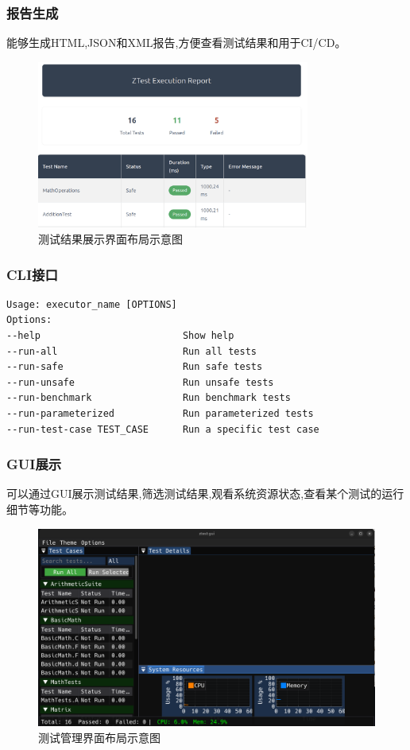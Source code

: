\documentclass{article}
\begin{document}
\subsubsection{报告生成}
能够生成HTML,JSON和XML报告,方便查看测试结果和用于CI/CD。
\begin{figure}[H]
    \centering
    \includegraphics[width=0.8\textwidth]{img/report.png}
    \caption{测试结果展示界面布局示意图}
    \label{fig:report}
    \small
\end{figure}
\subsubsection{CLI接口}
\begin{framed}
    \begin{lstlisting}
Usage: executor_name [OPTIONS] 
Options: 
--help                         Show help 
--run-all                      Run all tests
--run-safe                     Run safe tests
--run-unsafe                   Run unsafe tests
--run-benchmark                Run benchmark tests
--run-parameterized            Run parameterized tests
--run-test-case TEST_CASE      Run a specific test case
\end{lstlisting}
\end{framed}

\subsubsection{GUI展示}
可以通过GUI展示测试结果,筛选测试结果,观看系统资源状态,查看某个测试的运行细节等功能。
\begin{figure}[H]
    \centering
    \includegraphics[width=\textwidth]{img/gui.png}
    \caption{测试管理界面布局示意图}
    \label{fig:gui}
    \small
\end{figure}
\end{document}
